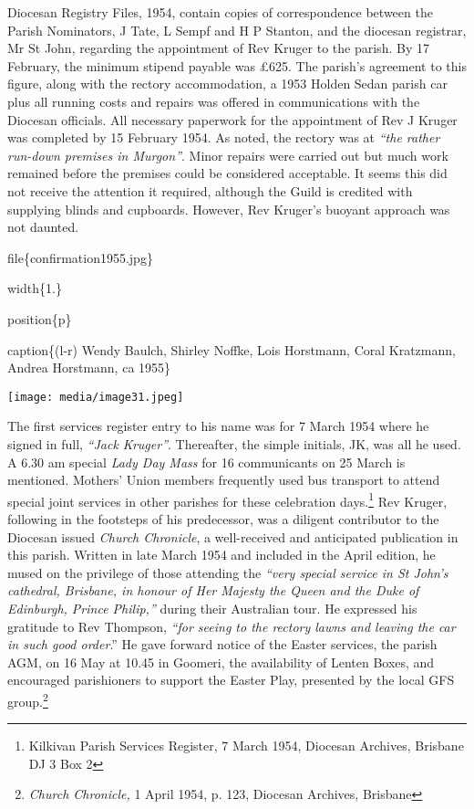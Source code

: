 Diocesan Registry Files, 1954, contain copies of correspondence between the Parish Nominators, J Tate, L Sempf and H P Stanton, and the diocesan registrar, Mr St John, regarding the appointment of Rev Kruger to the parish. By 17 February, the minimum stipend payable was £625. The parish's agreement to this figure, along with the rectory accommodation, a 1953 Holden Sedan parish car plus all running costs and repairs was offered in communications with the Diocesan officials. All necessary paperwork for the appointment of Rev J Kruger was completed by 15 February 1954. As noted, the rectory was at \emph{``the rather run-down premises in Murgon''}. Minor repairs were carried out but much work remained before the premises could be considered acceptable. It seems this did not receive the attention it required, although the Guild is credited with supplying blinds and cupboards. However, Rev Kruger's buoyant approach was not daunted.

file\{confirmation1955.jpg\}

width\{1.\}

position\{p\}

caption\{(l-r) Wendy Baulch, Shirley Noffke, Lois Horstmann, Coral Kratzmann, Andrea Horstmann, ca 1955\}

\texttt{[image: media/image31.jpeg]}

The first services register entry to his name was for 7 March 1954 where he signed in full, \emph{``Jack Kruger''}. Thereafter, the simple initials, JK, was all he used. A 6.30 am special \emph{Lady Day Mass} for 16 communicants on 25 March is mentioned. Mothers' Union members frequently used bus transport to attend special joint services in other parishes for these celebration days.\footnote{Kilkivan Parish Services Register, 7 March 1954, Diocesan Archives, Brisbane DJ 3 Box 2} Rev Kruger, following in the footsteps of his predecessor, was a diligent contributor to the Diocesan issued \emph{Church Chronicle}, a well-received and anticipated publication in this parish. Written in late March 1954 and included in the April edition, he mused on the privilege of those attending the \emph{``very special service in St John's cathedral, Brisbane, in honour of Her Majesty the Queen and the Duke of Edinburgh, Prince Philip,''} during their Australian tour. He expressed his gratitude to Rev Thompson, \emph{``for seeing to the rectory lawns and leaving the car in such good order}.'' He gave forward notice of the Easter services, the parish AGM, on 16 May at 10.45 in Goomeri, the availability of Lenten Boxes, and encouraged parishioners to support the Easter Play, presented by the local GFS group.\footnote{\emph{Church Chronicle,} 1 April 1954, p. 123, Diocesan Archives, Brisbane}

